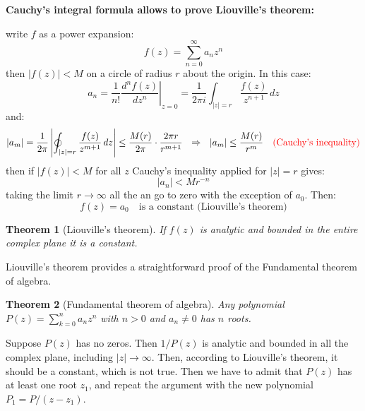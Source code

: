 \documentclass{article}
\newtheorem{theorem}{Theorem}
\begin{document}
\noindent
\textbf{Cauchy’s integral formula allows to prove Liouville’s theorem:}

\begin{center}
\end{center}

\noindent
write $f$ as a power expansion:
\begin{equation}
    f(z) = \sum_{n=0}^\infty a_n z^n
\end{equation}
then $|f(z)|<M$ on a circle of radius $r$ about the origin. In this case:
\begin{equation}
    a_n = \frac{1}{n!} \left. \frac{d^n f(z)}{d z^n} \right|_{z = 0}
= \frac{1}{2\pi i} \int_{|z| = r} \frac{f(z)}{z^{n+1}} \, dz
\end{equation}
and:
\begin{equation}
    |a_m| = \frac{1}{2\pi} \left|  \oint_{|z| = r} \frac{f(z)}{z^{m+1}} \, dz \right|
\leq \frac{M(r)}{2\pi} \cdot \frac{2\pi r}{r^{m+1}}  \  \ \Rightarrow \ \ 
|a_m| \leq \frac{M(r)}{r^m} \quad \color{red} \text{(Cauchy's inequality)} \color{black}
\end{equation}
then if $|f(z)|<M$ for all $z$ Cauchy’s inequality applied for $|z|=r$ gives:
\begin{equation}
    |a_n| < Mr^{-n}
\end{equation}
taking the limit $r \rightarrow \infty$ all the an go to zero with the exception of $a_0$. Then:
\begin{equation}
    f(z) = a_0  \quad \text{is a constant (Liouville’s theorem)}
\end{equation}

\begin{theorem}[Liouville's theorem]
    If $f(z)$ is analytic and bounded in the entire complex plane it is a constant.
\end{theorem}

\noindent
Liouville's theorem provides a straightforward proof of the Fundamental theorem of algebra.

\begin{theorem} [Fundamental theorem of algebra]
    Any polynomial $P(z) = \sum_{k=0}^n a_n z^n$ with $n>0$ and $a_n \neq 0$ has $n$ roots.
\end{theorem}

\noindent
Suppose $P(z)$ has no zeros. Then $1/P(z)$ is analytic and bounded in all the complex plane, including $|z| \to \infty$.
Then, according to Liouville's theorem, it should be a constant, which is not true.
Then we have to admit that $P(z)$ has at least one root $z_1$, and repeat the argument with the new polynomial $P_1 = P / (z - z_1)$.
\end{document}
